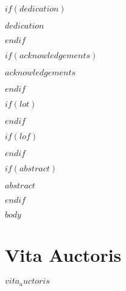 \documentclass[phdthesis,12pt,final]{wuthesis}
\begin{document}
$if(dedication)$
\cleardoublepage
\begin{thesisdedicationpage}
$dedication$
\end{thesisdedicationpage}
$endif$

$if(acknowledgements)$
\cleardoublepage
\begin{thesisacknowledgments}
$acknowledgements$
\end{thesisacknowledgments}
$endif$

\cleardoublepage
\begin{singlespace}
\setcounter{page}{2}
\renewcommand*\contentsname{Table of Contents}
\tableofcontents
\end{singlespace}

$if(lot)$
\cleardoublepage
{}
{}
\begin{center}
\end{center}
\vspace{1em}
\begin{singlespace}
\listoftables
\end{singlespace}
$endif$

$if(lof)$
\cleardoublepage
{}
{}
\begin{center}
\end{center}
\vspace{1em}
\begin{singlespace}
\listoffigures
\end{singlespace}
$endif$

$if(abstract)$
\cleardoublepage
\begin{thesisabstract}
$abstract$
\end{thesisabstract}
$endif$

\cleardoublepage
{}
\setcounter{page}{1}

$body$

\backmatter

\cleardoublepage
{}
{}
\chapter*{Vita Auctoris}
\begin{doublespace}
$vita_auctoris$
\end{doublespace}
\end{document}
